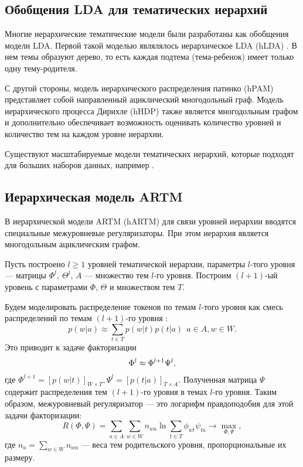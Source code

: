 \subsection{Обобщения LDA для тематических иерархий}
 Многие иерархические тематические модели были разработаны как обобщения модели LDA. Первой такой моделью являлялось иерархическое LDA (hLDA)  \cite{hLDA}. В нем темы образуют дерево, то есть каждая подтема (тема-ребенок) имеет только одну тему-родителя. 
 
 С другой стороны, модель иерархического распределения патинко (hPAM) \cite{hPAM} представляет собой направленный ациклический многодольный граф. Модель иерархического процесса Дирихле (hHDP) \cite{hHDP} также является многодольным графом и дополнительно
	 обеспечивает возможность оценивать количество уровней и количество тем на каждом уровне иерархии.

Существуют масштабируемые модели тематических иерархий, которые подходят для больших наборов данных, например \cite{Pujara2012, Zhai2012}.
\subsection{Иерархическая модель ARTM}
 В иерархической модели ARTM (hARTM) \cite{hARTM} для связи уровней иерархии вводятся специальные межуровневые регуляризаторы. При этом иерархия является многодольным ациклическим графом.

Пусть построено $l \geq 1$ уровней тематической иерархии, параметры $l$-того уровня --- матрицы $\Phi^l, \ \Theta^l$, $A$ --- множество тем $l$-го уровня. Построим $(l+1)$-ый уровень с параметрами $\Phi$, $\Theta$ и множеством тем $T$.

Будем моделировать распределение токенов по темам $l$-того уровня как смесь распределений по темам $(l+1)$-го уровня \cite{hARTM}:
$$p(w|a) \approx \sum\limits_{t \in T}  p(w|t)p(t|a) \ \ a\in A, w \in W.$$
Это приводит к задаче факторизации
\begin{align}
\Phi^l \approx \Phi^{l+1} \Psi^{l}, \notag
\end{align}
где $\Phi^{l+1} = [p(w|t)]_{W \times T}, \Psi^{l}=[p(t|a)]_{T \times A}$. Полученная матрица $\Psi$ содержит распределения тем $(l+1)$-го уровня в темах $l$-го уровня. 
Таким образом, межуровневый регуляризатор --- это логарифм правдоподобия для этой задачи факторизации: $$R(\Phi, \Psi) = \sum\limits_{a \in A} \sum\limits_{w \in W} n_{wa} \ln{\sum\limits_{t \in T} \phi_{wt}\psi_{ta}}\rightarrow 
\max\limits_{\Phi, \Psi},$$ где $n_{a} = \sum\limits_{w \in W} n_{wa}$ --- веса тем родительского уровня, пропорциональные их размеру.


